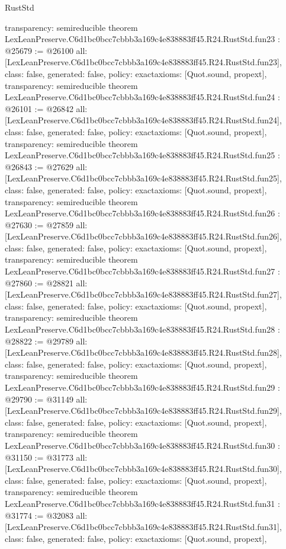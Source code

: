 \begin{lexlean}{RustStd}
\begin{coremodule}
{  transparency: semireducible
}
theorem LexLeanPreserve.C6d1bc0bcc7cbbb3a169c4e838883ff45.R24.RustStd.fun23 : @25679 := @26100 {
  all: [LexLeanPreserve.C6d1bc0bcc7cbbb3a169c4e838883ff45.R24.RustStd.fun23],
  class: false,
  generated: false,
  policy: exact{axioms: [Quot.sound, propext]},
  transparency: semireducible
}
theorem LexLeanPreserve.C6d1bc0bcc7cbbb3a169c4e838883ff45.R24.RustStd.fun24 : @26101 := @26842 {
  all: [LexLeanPreserve.C6d1bc0bcc7cbbb3a169c4e838883ff45.R24.RustStd.fun24],
  class: false,
  generated: false,
  policy: exact{axioms: [Quot.sound, propext]},
  transparency: semireducible
}
theorem LexLeanPreserve.C6d1bc0bcc7cbbb3a169c4e838883ff45.R24.RustStd.fun25 : @26843 := @27629 {
  all: [LexLeanPreserve.C6d1bc0bcc7cbbb3a169c4e838883ff45.R24.RustStd.fun25],
  class: false,
  generated: false,
  policy: exact{axioms: [Quot.sound, propext]},
  transparency: semireducible
}
theorem LexLeanPreserve.C6d1bc0bcc7cbbb3a169c4e838883ff45.R24.RustStd.fun26 : @27630 := @27859 {
  all: [LexLeanPreserve.C6d1bc0bcc7cbbb3a169c4e838883ff45.R24.RustStd.fun26],
  class: false,
  generated: false,
  policy: exact{axioms: [Quot.sound, propext]},
  transparency: semireducible
}
theorem LexLeanPreserve.C6d1bc0bcc7cbbb3a169c4e838883ff45.R24.RustStd.fun27 : @27860 := @28821 {
  all: [LexLeanPreserve.C6d1bc0bcc7cbbb3a169c4e838883ff45.R24.RustStd.fun27],
  class: false,
  generated: false,
  policy: exact{axioms: [Quot.sound, propext]},
  transparency: semireducible
}
theorem LexLeanPreserve.C6d1bc0bcc7cbbb3a169c4e838883ff45.R24.RustStd.fun28 : @28822 := @29789 {
  all: [LexLeanPreserve.C6d1bc0bcc7cbbb3a169c4e838883ff45.R24.RustStd.fun28],
  class: false,
  generated: false,
  policy: exact{axioms: [Quot.sound, propext]},
  transparency: semireducible
}
theorem LexLeanPreserve.C6d1bc0bcc7cbbb3a169c4e838883ff45.R24.RustStd.fun29 : @29790 := @31149 {
  all: [LexLeanPreserve.C6d1bc0bcc7cbbb3a169c4e838883ff45.R24.RustStd.fun29],
  class: false,
  generated: false,
  policy: exact{axioms: [Quot.sound, propext]},
  transparency: semireducible
}
theorem LexLeanPreserve.C6d1bc0bcc7cbbb3a169c4e838883ff45.R24.RustStd.fun30 : @31150 := @31773 {
  all: [LexLeanPreserve.C6d1bc0bcc7cbbb3a169c4e838883ff45.R24.RustStd.fun30],
  class: false,
  generated: false,
  policy: exact{axioms: [Quot.sound, propext]},
  transparency: semireducible
}
theorem LexLeanPreserve.C6d1bc0bcc7cbbb3a169c4e838883ff45.R24.RustStd.fun31 : @31774 := @32083 {
  all: [LexLeanPreserve.C6d1bc0bcc7cbbb3a169c4e838883ff45.R24.RustStd.fun31],
  class: false,
  generated: false,
  policy: exact{axioms: [Quot.sound, propext]},
}
\end{coremodule}
\end{lexlean}
